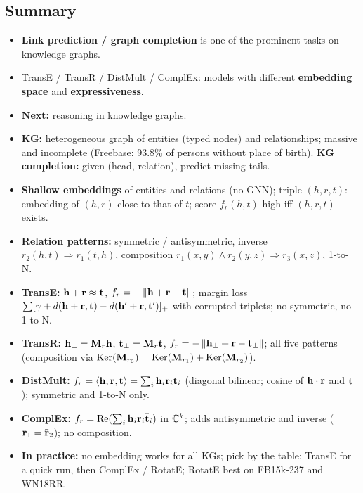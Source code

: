 \subsection{Summary}\label{sec:lec10-summary}

\begin{itemize}
  \item \textbf{Link prediction / graph completion} is one of the prominent tasks
    on knowledge graphs.
  \item TransE / TransR / DistMult / ComplEx: models with different
    \textbf{embedding space} and \textbf{expressiveness}.
  \item \textbf{Next:} reasoning in knowledge graphs.
\end{itemize}

\bigskip{}
{}
\begin{summarybox}
  \begin{itemize}
    \item \textbf{KG:} heterogeneous graph of entities (typed nodes) and
      relationships; massive and incomplete (Freebase: 93.8\% of persons without
      place of birth). \textbf{KG completion:} given (head, relation), predict
      missing tails.
    \item \textbf{Shallow embeddings} of entities and relations (no GNN); triple
      $(h,r,t)$: embedding of $(h,r)$ close to that of $t$; score $f_r(h,t)$ high
      iff $(h,r,t)$ exists.
    \item \textbf{Relation patterns:} symmetric / antisymmetric, inverse
      $r_2(h,t)\Rightarrow r_1(t,h)$, composition
      $r_1(x,y)\wedge r_2(y,z)\Rightarrow r_3(x,z)$, 1-to-N.
    \item \textbf{TransE:} $\mathbf{h}+\mathbf{r}\approx\mathbf{t}$, $f_r=-\left\lVert \mathbf{h}+\mathbf{r}-\mathbf{t} \right\rVert$; margin
      loss $\sum[\gamma+d(\mathbf{h}+\mathbf{r},\mathbf{t})-d(\mathbf{h}'+\mathbf{r},\mathbf{t}')]_+$ with corrupted
      triplets; no symmetric, no 1-to-N.
    \item \textbf{TransR:} $\mathbf{h}_\perp=\mathbf{M}_r\mathbf{h}$, $\mathbf{t}_\perp=\mathbf{M}_r\mathbf{t}$,
      $f_r=-\left\lVert \mathbf{h}_\perp+\mathbf{r}-\mathbf{t}_\perp \right\rVert$; all five patterns (composition via
      $\operatorname{Ker}(\mathbf{M}_{r_3})=\operatorname{Ker}(\mathbf{M}_{r_1})+\operatorname{Ker}(\mathbf{M}_{r_2})$).
    \item \textbf{DistMult:} $f_r=\langle\mathbf{h},\mathbf{r},\mathbf{t}\rangle=\sum_i\mathbf{h}_i\mathbf{r}_i\mathbf{t}_i$
      (diagonal bilinear; cosine of $\mathbf{h}\cdot\mathbf{r}$ and $\mathbf{t}$); symmetric and
      1-to-N only.
    \item \textbf{ComplEx:} $f_r=\operatorname{Re}(\sum_i\mathbf{h}_i\mathbf{r}_i\bar{\mathbf{t}}_i)$ in $\mathbb{C}^k$;
      adds antisymmetric and inverse ($\mathbf{r}_1=\bar{\mathbf{r}}_2$); no composition.
    \item \textbf{In practice:} no embedding works for all KGs; pick by the table;
      TransE for a quick run, then ComplEx / RotatE; RotatE best on FB15k-237 and
      WN18RR.
  \end{itemize}
\end{summarybox}
